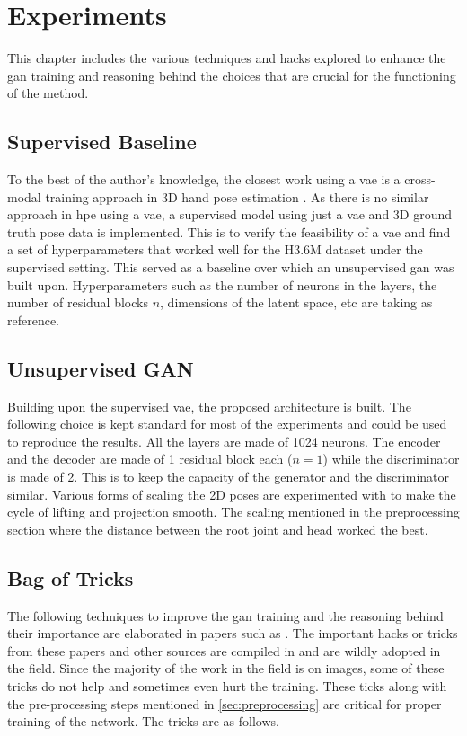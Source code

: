 \chapter{Experiments}
\label{chap:experiments}
This chapter includes the various techniques and hacks explored to enhance the \ac{gan} training and reasoning behind the choices that are crucial for the functioning of the method.%

\section{Supervised Baseline}
To the best of the author's knowledge, the closest work using a \ac{vae} is a cross-modal training approach in 3D hand pose estimation \cite{crossmodal}. As there is no similar approach in \ac{hpe} using a \ac{vae}, a supervised model using just a \ac{vae} and 3D ground truth pose data is implemented. This is to verify the feasibility of a \ac{vae} and find a set of hyperparameters that worked well for the H3.6M dataset under the supervised setting. This served as a baseline over which an unsupervised \ac{gan} was built upon. Hyperparameters such as the number of neurons in the layers, the number of residual blocks $n$, dimensions of the latent space, etc are taking as reference.

\section{Unsupervised GAN}
Building upon the supervised \ac{vae}, the proposed architecture is built. The following choice is kept standard for most of the experiments and could be used to reproduce the results. All the layers are made of 1024 neurons. The encoder and the decoder are made of 1 residual block each ($n = 1$) while the discriminator is made of 2. This is to keep the capacity of the generator and the discriminator similar. Various forms of scaling the 2D poses are experimented with to make the cycle of lifting and projection smooth. The scaling mentioned in the preprocessing section where the distance between the root joint and head worked the best. %

\section{Bag of Tricks}
\label{sec:bag_of_tricks}
The following techniques to improve the \ac{gan} training and the reasoning behind their importance are elaborated in papers such as \cite{soumith2017wasserstein,goodfellow2014generative,openaigan2wgan,improved_gan}. The important hacks or tricks from these papers and other sources are compiled in \cite{gan_hacks} and are wildly adopted in the field. Since the majority of the work in the field is on images, some of these tricks do not help and sometimes even hurt the training. These ticks along with the pre-processing steps mentioned in \ref{sec:preprocessing} are critical for proper training of the network. The tricks are as follows. %
 
